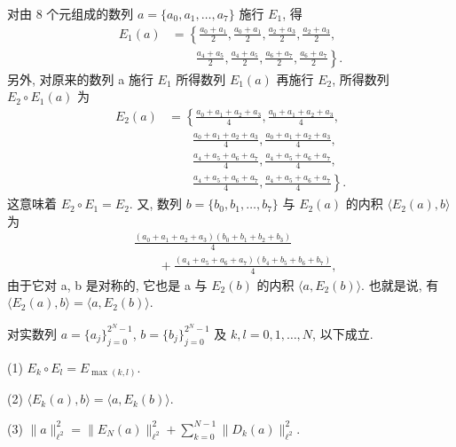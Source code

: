 \begin{example}\label{exa:1.15}
对由 8 个元组成的数列 $a = \{a_{0}, a_{1}, \ldots, a_{7}\}$ 施行 $E_{1}$, 得
\begin{align*}
E_{1}(a) &= \left\{\frac{a_{0}+a_{1}}{2}, \frac{a_{0}+a_{1}}{2}, \frac{a_{2}+a_{3}}{2}, \frac{a_{2}+a_{3}}{2},\right. \\
&\qquad \left.\frac{a_{4}+a_{5}}{2}, \frac{a_{4}+a_{5}}{2}, \frac{a_{6}+a_{7}}{2}, \frac{a_{6}+a_{7}}{2}\right\}.
\end{align*}
另外, 对原来的数列 a 施行 $E_{1}$ 所得数列 $E_{1}(a)$ 再施行 $E_{2}$, 所得数列 $E_{2} \circ E_{1}(a)$ 为
\begin{align*}
E_{2}(a) &= \left\{\frac{a_{0}+a_{1}+a_{2}+a_{3}}{4}, \frac{a_{0}+a_{1}+a_{2}+a_{3}}{4},\right. \\
&\qquad \left.\frac{a_{0}+a_{1}+a_{2}+a_{3}}{4}, \frac{a_{0}+a_{1}+a_{2}+a_{3}}{4},\right. \\
&\qquad \left.\frac{a_{4}+a_{5}+a_{6}+a_{7}}{4}, \frac{a_{4}+a_{5}+a_{6}+a_{7}}{4},\right. \\
&\qquad \left.\frac{a_{4}+a_{5}+a_{6}+a_{7}}{4}, \frac{a_{4}+a_{5}+a_{6}+a_{7}}{4}\right\}.
\end{align*}
这意味着 $E_{2} \circ E_{1} = E_{2}$. 又, 数列 $b = \{b_{0}, b_{1}, \ldots, b_{7}\}$ 与 $E_{2}(a)$ 的内积 $\langle E_{2}(a), b \rangle$ 为
\begin{align*}
&\frac{(a_{0}+a_{1}+a_{2}+a_{3})(b_{0}+b_{1}+b_{2}+b_{3})}{4} \\
&\qquad + \frac{(a_{4}+a_{5}+a_{6}+a_{7})(b_{4}+b_{5}+b_{6}+b_{7})}{4},
\end{align*}
由于它对 a, b 是对称的, 它也是 a 与 $E_{2}(b)$ 的内积 $\langle a, E_{2}(b) \rangle$. 也就是说, 有 $\langle E_{2}(a), b \rangle = \langle a, E_{2}(b) \rangle$.
\end{example}

\begin{theorem}\label{thm:1.9}
对实数列 $a = \{a_{j}\}_{j=0}^{2^{N}-1}$, $b = \{b_{j}\}_{j=0}^{2^{N}-1}$ 及 $k, l = 0, 1, \ldots, N$, 以下成立.

(1) $E_{k} \circ E_{l} = E_{\max(k,l)}$.

(2) $\langle E_{k}(a), b \rangle = \langle a, E_{k}(b) \rangle$.

(3) $\|a\|_{\ell^{2}}^{2} = \|E_{N}(a)\|_{\ell^{2}}^{2} + \sum_{k=0}^{N-1}\|D_{k}(a)\|_{\ell^{2}}^{2}$.
\end{theorem}

